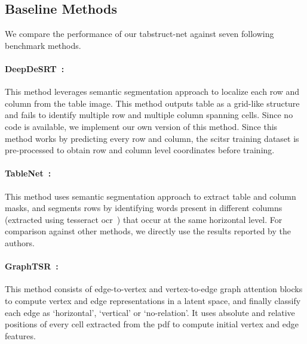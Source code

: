\documentclass[runningheads]{llncs}
\begin{document}
\subsection*{Baseline Methods} \label{baseline_methods_extra}
We compare the performance of our {\sc t}ab{\sc s}truct-{\sc n}et against seven following benchmark methods.

\paragraph{\textbf{DeepDeSRT~\cite{schreiber2017deepdesrt}:}} This method leverages semantic segmentation approach to localize each row and column from the table image. This method outputs table as a grid-like structure and fails to identify multiple row and multiple column spanning cells. Since no code is available, we implement our own version of this method. Since this method works by predicting every row and column, the {\sc s}ci{\sc tsr} training dataset is pre-processed to obtain row and column level coordinates before training.
    
\paragraph{\textbf{TableNet~\cite{paliwal2019tablenet}:}} This method uses semantic segmentation approach to extract table and column masks, and segments rows by identifying words present in different columns (extracted using {\sc t}esseract {\sc ocr}~\cite{smith2007overview}) that occur at the same horizontal level. For comparison against other methods, we directly use the results reported by the authors.
    
\paragraph{\textbf{GraphTSR~\cite{chi2019complicated}:}} This method consists of edge-to-vertex and vertex-to-edge graph attention blocks to compute vertex and edge representations in a latent space, and finally classify each edge as `horizontal', `vertical' or `no-relation'. It uses absolute and relative positions of every cell extracted from the {\sc pdf} to compute initial vertex and edge features.
    
\end{document}
